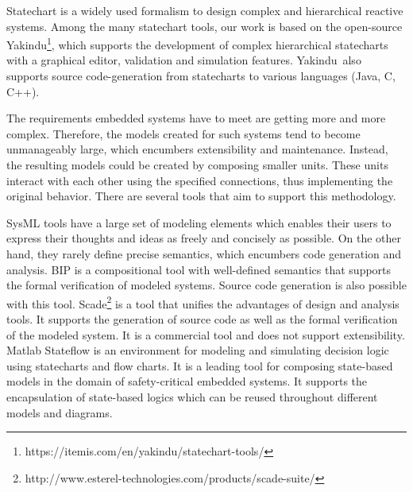 \documentclass[conference]{IEEEtran}
\newcommand{\Yakindu}{\textsf{Yakindu}}
\begin{document}
%

Statechart \cite{Harel:1987:SVF:34884.34886} is a widely used formalism to design complex and hierarchical reactive systems. Among the many statechart tools, our work is based on the open-source \Yakindu\footnote{https://itemis.com/en/yakindu/statechart-tools/}, which supports the development of complex hierarchical statecharts with a graphical editor, validation and simulation features. \Yakindu\ also supports source code-generation from statecharts to various languages (Java, C, C++).

The requirements embedded systems have to meet are getting more and more complex. Therefore, the models created for such systems tend to become unmanageably large, which encumbers extensibility and maintenance. Instead, the resulting models could be created by composing smaller units. These units interact with each other using the specified connections, thus implementing the original behavior. There are several tools that aim to support this methodology.

SysML \cite{OMGSysML,Delligatti:2013:SDB:2560076} tools have a large set of modeling elements which enables their users to express their thoughts and ideas as freely and concisely as possible. On the other hand, they rarely define precise semantics, which encumbers code generation and analysis. BIP \cite{Basu:2006:MHR:1158333.1158344,konnov_et_al:LIPIcs:2016:6167,Bozga:2009:MSS:1629335.1629347} is a compositional tool with well-defined semantics that supports the formal verification of modeled systems. Source code generation is also possible with this tool. Scade\footnote{http://www.esterel-technologies.com/products/scade-suite/} \cite{bghm14,venky_08_statemate} is a tool that unifies the advantages of design and analysis tools. It supports the generation of source code as well as the formal verification of the modeled system. It is a commercial tool and does not support extensibility.
Matlab Stateflow \cite{Chen2016} is an environment for modeling and simulating decision logic using statecharts and flow charts. It is a leading tool for composing state-based models in the domain of safety-critical embedded systems. It supports the encapsulation of state-based logics which can be reused throughout different models and diagrams.
\end{document}
